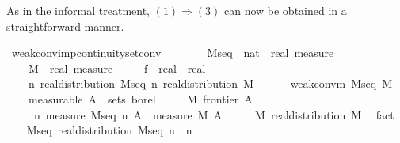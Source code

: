 \documentclass{article}
\theoremstyle{definition}
\begin{document}
\medskip

As in the informal treatment, $(1) \Longrightarrow (3)$ can now be obtained in a straightforward manner.

\medskip

\begin{isabellebody}
\isamarkupfalse%
\ weak{\isacharunderscore}conv{\isacharunderscore}imp{\isacharunderscore}continuity{\isacharunderscore}set{\isacharunderscore}conv{\isacharcolon}\isanewline
\ \ \ \isanewline
\ \ \ \ M{\isacharunderscore}seq\ {\isacharcolon}{\isacharcolon}\ {\isachardoublequoteopen}nat\ {\isasymRightarrow}\ real\ measure{\isachardoublequoteclose}\ \isanewline
\ \ \ \ M\ {\isacharcolon}{\isacharcolon}\ {\isachardoublequoteopen}real\ measure{\isachardoublequoteclose}\ \isanewline
\ \ \ \ f\ {\isacharcolon}{\isacharcolon}\ {\isachardoublequoteopen}real\ {\isasymRightarrow}\ real{\isachardoublequoteclose}\isanewline
\ \ \ \isanewline
\ \ \ \ {\isachardoublequoteopen}{\isasymAnd}n{\isachardot}\ real{\isacharunderscore}distribution\ {\isacharparenleft}M{\isacharunderscore}seq\ n{\isacharparenright}{\isachardoublequoteclose}\ {\isachardoublequoteopen}real{\isacharunderscore}distribution\ M{\isachardoublequoteclose}\ \ \isanewline
\ \ \ \ {\isachardoublequoteopen}weak{\isacharunderscore}conv{\isacharunderscore}m\ M{\isacharunderscore}seq\ M{\isachardoublequoteclose}\ \isanewline
\ \ \ \ {\isacharbrackleft}measurable{\isacharbrackright}{\isacharcolon}\ {\isachardoublequoteopen}A\ {\isasymin}\ sets\ borel{\isachardoublequoteclose}\ \isanewline
\ \ \ \ {\isachardoublequoteopen}M\ {\isacharparenleft}frontier\ A{\isacharparenright}\ {\isacharequal}\ {}{\isachardoublequoteclose}\isanewline
\ \ \ \isanewline
\ \ \ \ {\isachardoublequoteopen}{\isacharparenleft}{\isasymlambda}\ n{\isachardot}\ {\isacharparenleft}measure\ {\isacharparenleft}M{\isacharunderscore}seq\ n{\isacharparenright}\ A{\isacharparenright}{\isacharparenright}\ {\isacharminus}{\isacharminus}{\isacharminus}{\isacharminus}{\isachargreater}\ measure\ M\ A{\isachardoublequoteclose}\isanewline
{}\isamarkupfalse%
\ {\isacharminus}\isanewline
\ \ \isamarkupfalse%
\ M{\isacharcolon}\ real{\isacharunderscore}distribution\ M\ \isamarkupfalse%
\ fact\isanewline
\ \ \isamarkupfalse%
\ M{\isacharunderscore}seq{\isacharcolon}\ real{\isacharunderscore}distribution\ {\isachardoublequoteopen}M{\isacharunderscore}seq\ n{\isachardoublequoteclose}\ \ n\ \isamarkupfalse%

\end{isabellebody}
\end{document}
